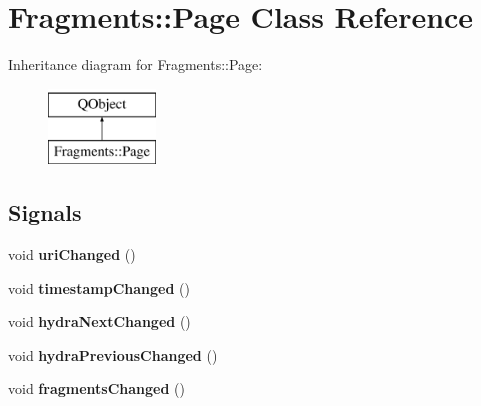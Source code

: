 \hypertarget{classFragments_1_1Page}{}\section{Fragments\+:\+:Page Class Reference}
\label{classFragments_1_1Page}
Inheritance diagram for Fragments\+:\+:Page\+:\begin{figure}[H]
\begin{center}
\leavevmode
\includegraphics[height=2.000000cm]{classFragments_1_1Page}
\end{center}
\end{figure}
\subsection*{Signals}
\begin{DoxyCompactItemize}
\item 
\mbox{\label{classFragments_1_1Page_a03f40d5c9520331432c9f1c7ab9f805c}} 
void {\bfseries uri\+Changed} ()
\item 
\mbox{\label{classFragments_1_1Page_acfdd19abc8342361f975b4d9d10e2e64}} 
void {\bfseries timestamp\+Changed} ()
\item 
\mbox{\label{classFragments_1_1Page_a0b56ee63d18b43654cdfebd6a39c8d4f}} 
void {\bfseries hydra\+Next\+Changed} ()
\item 
\mbox{\label{classFragments_1_1Page_a6f63a3428523cfa79ab30bfce32c0509}} 
void {\bfseries hydra\+Previous\+Changed} ()
\item 
\mbox{\label{classFragments_1_1Page_a6d449124d048af31d3e1e24a66c34636}} 
void {\bfseries fragments\+Changed} ()
\end{DoxyCompactItemize}
